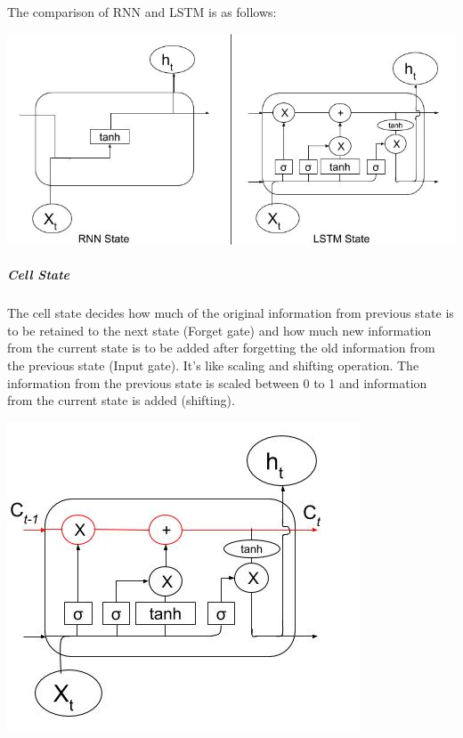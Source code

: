 The comparison of RNN and LSTM is as follows:

				\begin{center}
				\includegraphics[width=\linewidth]{figures/Comparison-of-RNN-and-LSTM-Cells.jpg}	
				\label{fig: Comparison of RNN and LSTM State}
				\end{center}

\subparagraph{Cell State}

The cell state decides how much of the original information from previous state is to be retained to the next state (Forget gate) and how much new information from the current state is to be added after forgetting the old information from the previous state (Input gate). It's like scaling and shifting operation. The information from the previous state is scaled between 0 to 1 and information from the current state is added (shifting).

				\begin{center}
				\includegraphics[width=\linewidth]{figures/Cell-State.jpg}	
				\label{fig: Cell State}
				\end{center}

